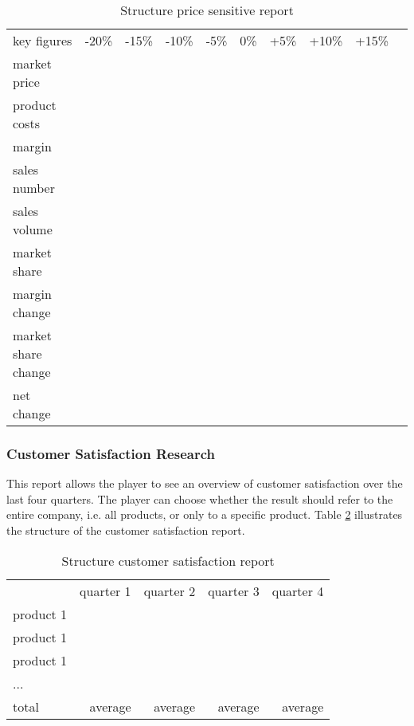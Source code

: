 \begin{table}[ht]
\centering
\begin{tabular}{|l|r|r|r|r|r|r|r|r|r|}
\hline
key figures             & -20\% & -15\% & -10\% & -5\%  & 0\%   & +5\%  & +10\% & +15\%   \\
market price            &       &       &       &       &       &       &       &         \\
product costs           &       &       &       &       &       &       &       &         \\
margin                  &       &       &       &       &       &       &       &         \\
sales number            &       &       &       &       &       &       &       &         \\
sales volume            &       &       &       &       &       &       &       &         \\
market share            &       &       &       &       &       &       &       &         \\
margin change           &       &       &       &       &       &       &       &         \\
market share change     &       &       &       &       &       &       &       &         \\
net change              &       &       &       &       &       &       &       &         \\
\hline
\end{tabular}
\caption{Structure price sensitive report}
\label{MR_price_sensitive}
\end{table}

\subsubsection{Customer Satisfaction Research}
This report allows the player to see an overview of customer satisfaction over the last four quarters. The player can choose whether the result should refer to the entire company, i.e. all products, or only to a specific product. Table \ref{MR_customer_satisfaction} illustrates the structure of the customer satisfaction report. \\

\begin{table}[ht]
\centering
\begin{tabular}{|l|r|r|r|r|}
\hline
            & quarter 1   & quarter 2  & quarter 3 & quarter 4 \\
product 1   &             &            &           &           \\
product 1   &             &            &           &           \\
product 1   &             &            &           &           \\
...         &             &            &           &           \\
total       & average     & average    & average   & average   \\
\hline
\end{tabular}
\caption{Structure customer satisfaction report}
\label{MR_customer_satisfaction}
\end{table}

